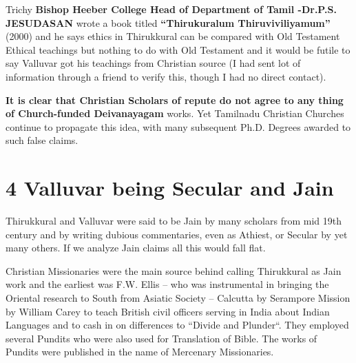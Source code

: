 Trichy \textbf{Bishop Heeber College Head of Department of Tamil -\break Dr.P.S. JESUDASAN} wrote a book titled \textbf{“Thirukuralum Thiruvi\-viliyamum”} (2000) and he says ethics in Thirukkural can be compared with Old Testament Ethical teachings but nothing to do with Old Testament and it would be futile to say Valluvar got his teachings from Christian source (I had sent lot of information through a friend to verify this, though I had no direct contact).

\textbf{It is clear that Christian Scholars of repute do not agree to any thing of Church-funded Deivanayagam} works. Yet Tamilnadu Christian Churches continue to propagate this idea, with many subsequent Ph.D. Degrees awarded to such false claims.


\section*{4 Valluvar being Secular and Jain}

Thirukkural and Valluvar were said to be Jain by many scholars from mid 19th century and by writing dubious commentaries, even as Athiest, or Secular by yet many others. If we analyze Jain claims all this would fall flat.

Christian Missionaries were the main source behind calling Thirukkural as Jain work and the earliest was F.W. Ellis – who was instrumental in bringing the Oriental research to South from Asiatic Society – Calcutta by Serampore Mission by William Carey to teach British civil officers serving in India about Indian Languages and to cash in on differences to “Divide and Plunder“. They employed several Pundits who were also used for Translation of Bible. The works of Pundits were published in the name of Mercenary Missionaries.


